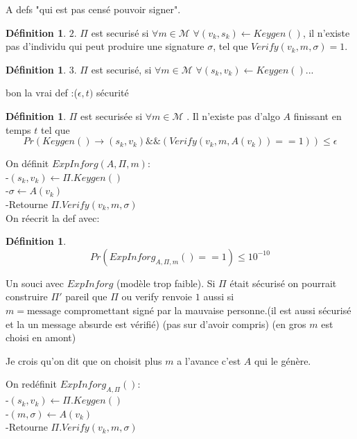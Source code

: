\documentclass[12pt]{article}
\theoremstyle{plain}
\theoremstyle{definition}
\newtheorem{defn}[subsubsection]{D\'efinition}
\theoremstyle{remark}
\newcommand{\M}{\mathcal{M}}
\begin{document}
A defs "qui est pas censé pouvoir signer".

\begin{defn}
    $2.$ $\Pi$ est securisé si $\forall m\in\M$ $\forall(v_k,s_k)\leftarrow Keygen()$, il n'existe pas d'individu qui peut produire une signature $\sigma$,
    tel que $Verify(v_k,m,\sigma)=1$.
\end{defn}

\begin{defn}
    $3.$ $\Pi$ est securisé, si $\forall m\in\M$ $\forall(s_k,v_k)\leftarrow Keygen()$...
\end{defn}

bon la vrai def :($\epsilon,t)$ sécurité
\begin{defn}
    $\Pi$ est securisée si $\forall m\in\M$ . Il n'existe pas d'algo $A$ finissant en temps $t$
    tel que $$Pr(Keygen()\rightarrow(s_k, v_k) \&\& (Verify(v_k, m, A(v_k)) == 1))\leq \epsilon$$
\end{defn}

On définit $ExpInforg(A,\Pi, m)$: \\
\indent \indent-$(s_k,v_k)\leftarrow \Pi.Keygen()$\\
\indent \indent-$\sigma \leftarrow A(v_k)$\\
\indent \indent-Retourne $\Pi.Verify(v_k, m, \sigma)$\\

On réecrit la def avec:
\begin{defn}
    $$Pr(ExpInforg_{A,\Pi,m}() == 1)\leq 10^{-10}$$
\end{defn}

Un souci avec $ExpInforg$ (modèle trop faible). Si $\Pi$ était sécurisé on pourrait construire
$\Pi'$ pareil que $\Pi$ ou verify renvoie $1$ aussi si $m = \text{message compromettant}$ signé par la mauvaise personne.(il est aussi sécurisé et la un message absurde est vérifié)
(pas sur d'avoir compris) (en gros $m$ est choisi en amont)


Je crois qu'on dit que on choisit plus $m$ a l'avance c'est $A$ qui le génère.\\
\newline

On redéfinit $ExpInforg_{A,\Pi}()$: \\
\indent \indent-$(s_k,v_k)\leftarrow \Pi.Keygen()$\\
\indent \indent-$(m, \sigma)\leftarrow A(v_k)$\\
\indent \indent-Retourne $\Pi.Verify(v_k, m, \sigma)$\\
\newline
\end{document}
